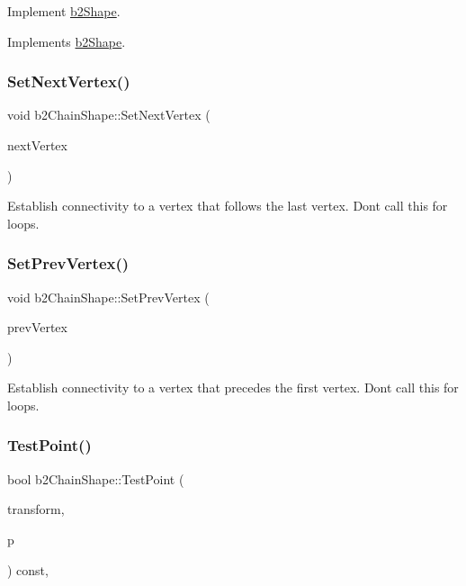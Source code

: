 Implement \mbox{\hyperlink{classb2_shape}{b2\+Shape}}. 



Implements \mbox{\hyperlink{classb2_shape_aee53a926f4fe64cd03693f6211ef6335}{b2\+Shape}}.

\mbox{\label{classb2_chain_shape_a15c7c2821a52266ef57621ac7d34a95f}} 
\subsubsection{\texorpdfstring{SetNextVertex()}{SetNextVertex()}}
{\footnotesize\ttfamily void b2\+Chain\+Shape\+::\+Set\+Next\+Vertex (\begin{DoxyParamCaption}\item[{const \mbox{\hyperlink{structb2_vec2}{b2\+Vec2}} \&}]{next\+Vertex }\end{DoxyParamCaption})}

Establish connectivity to a vertex that follows the last vertex. Don\textquotesingle{}t call this for loops. \mbox{\label{classb2_chain_shape_aeb2ddbe0c52a98885e91b7c8f597315b}} 
\subsubsection{\texorpdfstring{SetPrevVertex()}{SetPrevVertex()}}
{\footnotesize\ttfamily void b2\+Chain\+Shape\+::\+Set\+Prev\+Vertex (\begin{DoxyParamCaption}\item[{const \mbox{\hyperlink{structb2_vec2}{b2\+Vec2}} \&}]{prev\+Vertex }\end{DoxyParamCaption})}

Establish connectivity to a vertex that precedes the first vertex. Don\textquotesingle{}t call this for loops. \mbox{\label{classb2_chain_shape_afd03c8679f18f9962a6c76bde629c62a}} 
\subsubsection{\texorpdfstring{TestPoint()}{TestPoint()}}
{\footnotesize\ttfamily bool b2\+Chain\+Shape\+::\+Test\+Point (\begin{DoxyParamCaption}\item[{const \mbox{\hyperlink{structb2_transform}{b2\+Transform}} \&}]{transform,  }\item[{const \mbox{\hyperlink{structb2_vec2}{b2\+Vec2}} \&}]{p }\end{DoxyParamCaption}) const\hspace{0.3cm}{\ttfamily [override]}, {\ttfamily [virtual]}}

